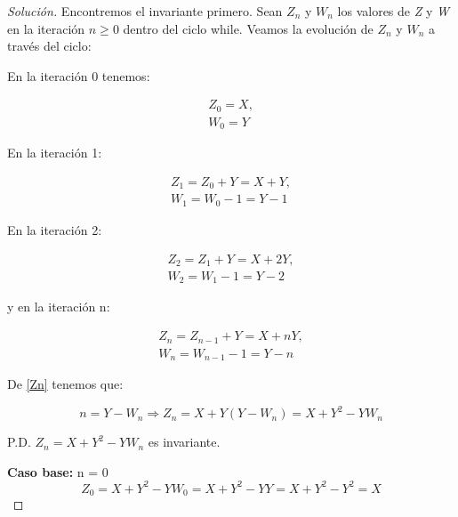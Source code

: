   \begin{proof}[Solución]
    Encontremos el invariante primero. Sean $Z_n$ y $W_n$ los valores
    de \textit{Z} y \textit{W} en la iteración $n \ge 0$ dentro del
    ciclo while. Veamos la evolución de $Z_n$ y $W_n$ a través del
    ciclo:

    En la iteración 0 tenemos:

    \begin{equation*}
      \begin{split}
        Z_0 = X,\\ W_0= Y
      \end{split}
    \end{equation*}



    En la iteración 1:

    \begin{equation*}
      \begin{split}
        Z_1 = Z_0 + Y = X + Y,\\W_1 = W_0 - 1 = Y - 1
      \end{split}
    \end{equation*}

    En la iteración 2:

    \begin{equation*}
      \begin{split}
        Z_2 = Z_1 + Y = X + 2Y,\\W_2 = W_1 - 1 = Y - 2
      \end{split}
    \end{equation*}

    y en la iteración n:

    \begin{equation}
      \label{Zn}
      \begin{split}
        Z_n = Z_{n-1} + Y = X + nY,\\W_n = W_{n-1} - 1 = Y - n
      \end{split}
    \end{equation}

    De \ref{Zn} tenemos que:

    \begin{equation}
        n = Y - W_n \Rightarrow Z_n = X + Y(Y - W_n) = X + Y^2 - YW_n
    \end{equation}

    P.D. $Z_n = X + Y^2 - YW_n$ es invariante.

    \textbf{Caso base:} n = 0\\
    \begin{equation*}
      Z_0 = X + Y^2 - YW_0 = X + Y^2 - YY = X + Y^2 - Y^2 = X
    \end{equation*}


\end{proof}
